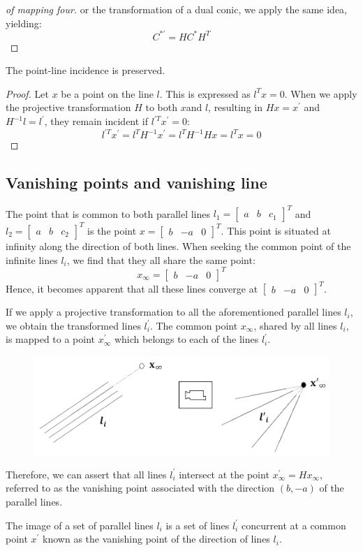 \documentclass[12pt, a4paper]{report}
\begin{document}
    \begin{proof}[of mapping four]
        or the transformation of a dual conic, we apply the same idea, yielding:
        \[C^{*'}=H C^{*}H^{T}\]
    \end{proof}
    The point-line incidence is preserved. 
    \begin{proof}
        Let $x$ be a point on the line $l$. 
        This is expressed as $l^Tx=0$. 
        When we apply the projective transformation $H$ to both $x$and $l$, resulting in $Hx=x^{'}$ and $H^{-1}l=l^{'}$, they remain incident if $l^{'T}x^{'}=0$:
        \[l^{'T}x^{'}=l^{T}H^{-1}x^{'}=l^{T}H^{-1}Hx=l^{T}x=0\]
    \end{proof}

    \subsection{Vanishing points and vanishing line}
    The point that is common to both parallel lines $l_1={\begin{bmatrix} a & b & c_1 \end{bmatrix}}^{T}$ and $l_2={\begin{bmatrix} a & b & c_2 \end{bmatrix}}^{T}$ is the point $x={\begin{bmatrix} b & -a & 0 \end{bmatrix}}^{T}$. 
    This point is situated at infinity along the direction of both lines.
    When seeking the common point of the infinite lines $l_i$, we find that they all share the same point:
    \[x_{\infty}={\begin{bmatrix} b & -a & 0 \end{bmatrix}}^{T}\]
    Hence, it becomes apparent that all these lines converge at ${\begin{bmatrix} b & -a & 0 \end{bmatrix}}^{T}$. 
    
    If we apply a projective transformation to all the aforementioned parallel lines $l_i$, we obtain the transformed lines $l_i^{'}$. 
    The common point $x_{\infty}$, shared by all lines $l_i$, is mapped to a point $x_{\infty}^{'}$ which belongs to each of the lines $l_i^{'}$. 
    \begin{figure}[H]
        \centering
        \includegraphics[width=0.5\linewidth]{images/vanishing.png}
    \end{figure}
    Therefore, we can assert that all lines $l_i^{'}$ intersect at the point $x_{\infty}^{'}=Hx_{\infty}$, referred to as the vanishing point associated with the direction $(b,-a)$ of the parallel lines. 
    \begin{theorem}
        The image of a set of parallel lines $l_i$ is a set of lines $l_i^{'}$ concurrent at a common point $x^{'}$ known as the vanishing point of the direction of lines $l_i$. 
    \end{theorem}
\end{document}
